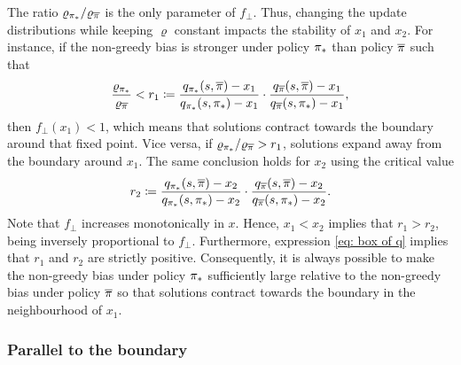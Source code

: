 The ratio $\varrho_{{\pi}_*}/\varrho_{\overline{\pi}}$ is the only parameter of $f_\perp$. Thus, changing the update distributions while keeping $\varrho$ constant impacts the stability of $x_1$ and $x_2$.
For instance, if the non-greedy bias is stronger under policy ${\pi}_*$ than policy $\overline{\pi}$ such that
\begin{align}
\label{eq: fixed point stability}
    \frac{\varrho_{{\pi}_*}}{\varrho_{\overline{\pi}}}
    <
    r_1 
    \coloneqq 
    \dfrac{q_{{\pi}_*}(s, \overline{\pi}) - x_1}{q_{{\pi}_*}(s, {\pi}_*) - x_1}
    \cdot
    \dfrac{q_{\overline{\pi}}(s, \overline{\pi}) - x_1}{q_{\overline{\pi}}(s, {\pi}_*) - x_1} ,
\end{align}
then $f_\perp(x_1) < 1$, which means that solutions contract towards the boundary around that fixed point.
Vice versa, if $\varrho_{{\pi}_*}/\varrho_{\overline{\pi}} > r_1$,
solutions expand away from the boundary around $x_1$.
The same conclusion holds for $x_2$ using the critical value
\begin{align}
\label{eq: fixed point stability second}
    r_2 \coloneqq
    \dfrac{q_{{\pi}_*}(s, \overline{\pi}) - x_2}{q_{{\pi}_*}(s, {\pi}_*) - x_2}
    \cdot
    \dfrac{q_{\overline{\pi}}(s, \overline{\pi}) - x_2}{q_{\overline{\pi}}(s, {\pi}_*) - x_2} .
\end{align}
Note that $f_\perp$ increases monotonically in $x$. Hence, $x_1 < x_2$ implies that $r_1 > r_2$, being inversely proportional to $f_\perp$. Furthermore, expression \eqref{eq: box of q} implies that $r_1$ and $r_2$ are strictly positive.
Consequently, it is always possible to make the non-greedy bias under policy ${\pi}_*$ sufficiently large relative to the non-greedy bias under policy $\overline{\pi}$ so that solutions contract towards the boundary in the neighbourhood of $x_1$.


\subsubsection{Parallel to the boundary}

